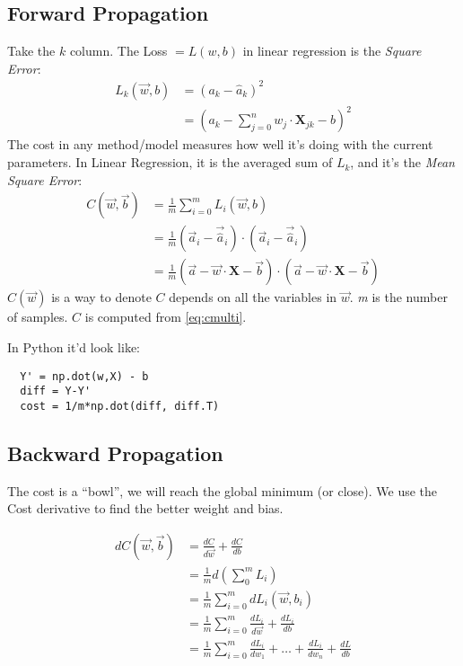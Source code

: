 \subsection{Forward Propagation}
Take the $k$ column. The Loss $= L(w,b)$ in linear regression is the \textit{Square Error}:
\begin{align*}
  L_k(\vec{w},b) &= (a_k - \hat{a}_k)^2\\
  &= (a_k - \sum_{j=0}^n w_j\cdot{}{\mathbf{X}}_{jk} - b)^2
\end{align*}
The cost in any method/model measures how well it's doing with the current parameters. In Linear Regression, it is the averaged sum of $L_k$, and it's the \textit{Mean Square Error}:
\begin{align}
  C(\vec{w}, \vec{b}) &= \frac{1}{m}\sum_{i=0}^m L_i(\vec{w}, b)\nonumber\\
  &=\frac{1}{m}(\vec{a}_i - \vec{\hat{a}}_i)\cdot{}(\vec{a}_i - \vec{\hat{a}}_i)\label{eq:cmulti}\\
  &= \frac{1}{m} (\vec{a} - \vec{w}\cdot{}\mathbf{X} - \vec{b})\cdot{}(\vec{a} - \vec{w}\cdot{}\mathbf{X} - \vec{b}) \nonumber
\end{align}
$C(\vec{w})$ is a way to denote $C$ depends on all the variables in $\vec{w}$. \textit{m} is the number of samples. $C$ is computed from \ref{eq:cmulti}.

In Python it'd look like:
\begin{center}
  \begin{BVerbatim}
  Y' = np.dot(w,X) - b
  diff = Y-Y' 
  cost = 1/m*np.dot(diff, diff.T)
  \end{BVerbatim}
\end{center}
\subsection{Backward Propagation}

The cost is a ``bowl'', we will reach the global minimum (or close).
We use the Cost derivative to find the better weight and bias. 

\begin{align}
  dC(\vec{w}, \vec{b}) &= \frac{dC}{d\vec{w}} + \frac{dC}{db}\nonumber\\
  &= \frac{1}{m} d(\sum^m_0 L_i)\nonumber\\
  &= \frac{1}{m} \sum^m_{i=0} dL_i(\vec{w}, b_i)\label{eq:diff}\\
  &= \frac{1}{m} \sum^m_{i=0} \frac{dL_i}{d\vec{w}} + \frac{dL_i}{db}\nonumber\\
  &= \frac{1}{m} \sum^m_{i=0} \frac{dL_i}{dw_1} +\ldots +\frac{dL_i}{dw_n} + \frac{dL}{db} \nonumber
\end{align}

